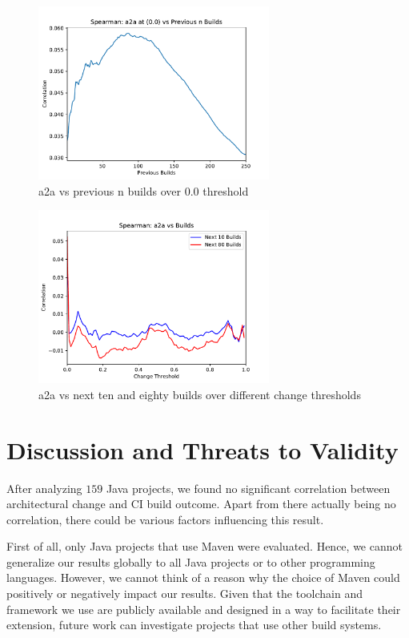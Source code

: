 \documentclass[sigconf, anonymous, review]{acmart}
\begin{document}
\begin{figure}[!t]
	\centering
	\includegraphics[width=3in]{assets/PrevN}
	\caption{a2a vs previous n builds over 0.0 threshold }
	\label{a2aPrevN}
\end{figure}

\begin{figure}[!t]
	\centering
	\includegraphics[width=3in]{assets/a2aCorr}
	\caption{a2a vs next ten and eighty builds over different change thresholds }
	\label{a2aPlot}
\end{figure}


\section{Discussion and Threats to Validity}

After analyzing $159$ Java projects, we found no significant correlation between architectural change and CI build outcome. Apart from there actually being no correlation, there could be various factors influencing this result. 

First of all, only Java projects that use Maven were evaluated. Hence, we cannot generalize our results globally to all Java projects or to other programming languages. However, we cannot think of a reason why the choice of Maven could positively or negatively impact our results. Given that the toolchain and framework we use are publicly available and designed in a way to facilitate their extension, future work can investigate projects that use other build systems.
\end{document}
